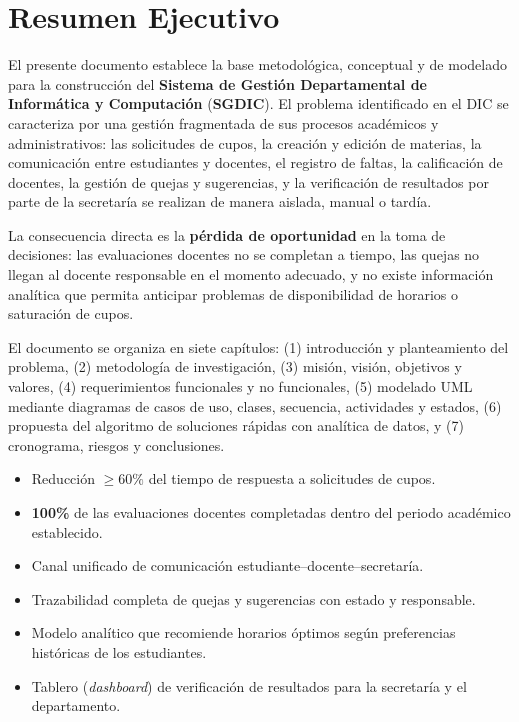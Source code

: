 \documentclass[12pt,letterpaper,oneside]{report}
\newcommand{\sistema}{\textbf{SGDIC}}
\begin{document}
\setcounter{page}{1}

\tableofcontents
\clearpage
\listoftables
\clearpage
\listoffigures
\clearpage

\chapter*{Resumen Ejecutivo}

El presente documento establece la base metodológica, conceptual y de modelado
para la construcción del \textbf{Sistema de Gestión Departamental de Informática y
Computación} (\sistema). El problema identificado en el \ac{DIC} se caracteriza por
una gestión fragmentada de sus procesos académicos y administrativos: las
solicitudes de cupos, la creación y edición de materias, la comunicación entre
estudiantes y docentes, el registro de faltas, la calificación de docentes, la
gestión de quejas y sugerencias, y la verificación de resultados por parte de la
secretaría se realizan de manera aislada, manual o tardía.

La consecuencia directa es la \textbf{pérdida de oportunidad} en la toma de
decisiones: las evaluaciones docentes no se completan a tiempo, las quejas no
llegan al docente responsable en el momento adecuado, y no existe información
analítica que permita anticipar problemas de disponibilidad de horarios o
saturación de cupos.

El documento se organiza en siete capítulos: (1) introducción y planteamiento del
problema, (2) metodología de investigación, (3) misión, visión, objetivos y
valores, (4) requerimientos funcionales y no funcionales, (5) modelado \ac{UML}
mediante diagramas de casos de uso, clases, secuencia, actividades y estados,
(6) propuesta del algoritmo de soluciones rápidas con analítica de datos, y
(7) cronograma, riesgos y conclusiones.

\begin{cajaNota}
\begin{itemize}[leftmargin=1.2cm, itemsep=2pt]
  \item Reducción $\geq 60\%$ del tiempo de respuesta a solicitudes de cupos.
  \item \textbf{100\%} de las evaluaciones docentes completadas dentro del periodo
        académico establecido.
  \item Canal unificado de comunicación estudiante--docente--secretaría.
  \item Trazabilidad completa de quejas y sugerencias con estado y responsable.
  \item Modelo analítico que recomiende horarios óptimos según preferencias
        históricas de los estudiantes.
  \item Tablero (\textit{dashboard}) de verificación de resultados para la
        secretaría y el departamento.
\end{itemize}
\end{cajaNota}
\end{document}
